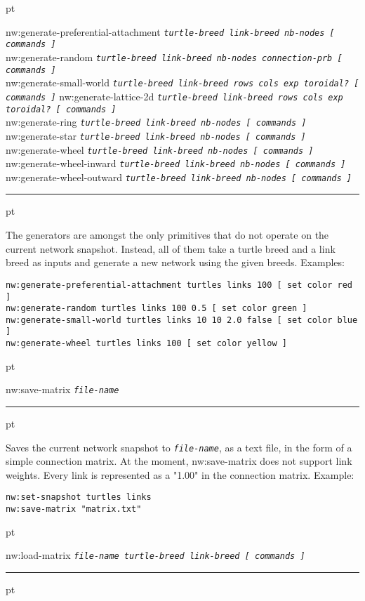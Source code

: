 \documentclass[12pt]{article}
\newenvironment{prim}{
  \leftskip 0cm
  \vskip 6 pt
  \ttfamily
  \bfseries
}{
  \hrule
  \vskip 6 pt
}
\newcommand{\param}[1]{\texttt{\textit{\textmd{#1}}}}
\begin{document}
\begin{prim}
nw:generate-preferential-attachment
\param{turtle-breed link-breed nb-nodes [ commands ]}\\
nw:generate-random
\param{turtle-breed link-breed nb-nodes connection-prb [ commands ]}\\
nw:generate-small-world
\param{turtle-breed link-breed rows cols exp toroidal? [ commands ]}
nw:generate-lattice-2d
\param{turtle-breed link-breed rows cols exp toroidal? [ commands ]}\\
nw:generate-ring
\param{turtle-breed link-breed nb-nodes [ commands ]}\\
nw:generate-star
\param{turtle-breed link-breed nb-nodes [ commands ]}\\
nw:generate-wheel
\param{turtle-breed link-breed nb-nodes [ commands ]}\\
nw:generate-wheel-inward
\param{turtle-breed link-breed nb-nodes [ commands ]}\\
nw:generate-wheel-outward
\param{turtle-breed link-breed nb-nodes [ commands ]}
\end{prim}

The generators are amongst the only primitives that do not operate on the
current network snapshot. Instead, all of them take a turtle breed and a link
breed as inputs and generate a new network using the given breeds. Examples:

\begin{Verbatim}
nw:generate-preferential-attachment turtles links 100 [ set color red ]
nw:generate-random turtles links 100 0.5 [ set color green ]
nw:generate-small-world turtles links 10 10 2.0 false [ set color blue ]
nw:generate-wheel turtles links 100 [ set color yellow ]
\end{Verbatim}

\begin{prim}
nw:save-matrix \param{file-name}
\end{prim}

Saves the current network snapshot to \param{file-name}, as a text file, in the
form of a simple connection matrix. At the moment, nw:save-matrix does not
support link weights. Every link is represented as a "1.00" in the connection
matrix. Example:

\begin{Verbatim}
nw:set-snapshot turtles links
nw:save-matrix "matrix.txt"
\end{Verbatim}

\begin{prim}
nw:load-matrix \param{file-name turtle-breed link-breed [ commands ]}
\end{prim}
\end{document}
